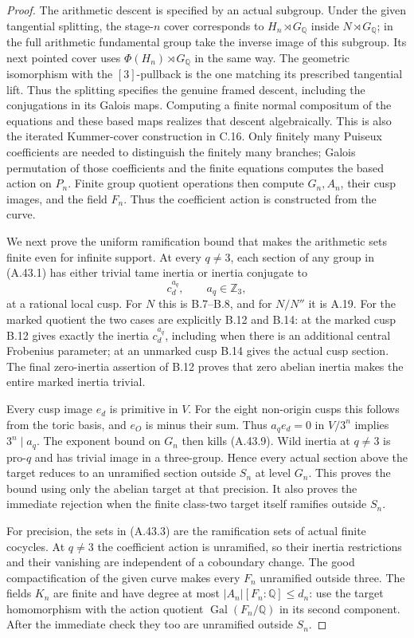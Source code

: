 \begin{proof}
The arithmetic descent is specified by an actual subgroup.
Under the given tangential splitting, the stage-$n$ cover
corresponds to $H_n\rtimes G_{\mathbb Q}$ inside
$N\rtimes G_{\mathbb Q}$; in the full arithmetic
fundamental group take the inverse image of this subgroup.
Its next pointed cover uses
$\Phi(H_n)\rtimes G_{\mathbb Q}$ in the same way.
The geometric isomorphism with the $[3]$-pullback is the
one matching its prescribed tangential lift. Thus the
splitting specifies the genuine framed descent, including
the conjugations in its Galois maps. Computing a finite
normal compositum of the equations and these based maps
realizes that descent algebraically. This is also the
iterated Kummer-cover construction in C.16.
Only finitely many Puiseux
coefficients are needed to distinguish the finitely many
branches; Galois permutation of those coefficients and
the finite equations computes the based action on $P_n$.
Finite group quotient operations then compute $G_n,A_n$,
their cusp images, and the field $F_n$. Thus the coefficient
action is constructed from the curve.

We next prove the uniform ramification bound that makes
the arithmetic sets finite even for infinite support.
At every $q\ne3$, each section of any group in (A.43.1)
has either trivial tame inertia or inertia conjugate to
\[
                         c_d^{a_q},\qquad a_q\in\mathbb Z_3,
 \tag{A.43.9}
\]
at a rational local cusp. For $N$ this is B.7--B.8, and
for $N/N''$ it is A.19. For the marked quotient the two
cases are explicitly B.12 and B.14: at the marked cusp
B.12 gives exactly the inertia $c_d^{a_q}$, including when
there is an additional central Frobenius parameter; at an
unmarked cusp B.14 gives the actual cusp section. The final
zero-inertia assertion of B.12 proves that zero abelian
inertia makes the entire marked inertia trivial.

Every cusp image $e_d$ is primitive in $V$. For the eight
non-origin cusps this follows from the toric basis, and
$e_O$ is minus their sum. Thus
$a_qe_d=0$ in $V/3^n$ implies $3^n\mid a_q$.
The exponent bound on $G_n$ then kills (A.43.9). Wild
inertia at $q\ne3$ is pro-$q$ and has trivial image in a
three-group. Hence every actual section above the target
reduces to an unramified section outside $S_n$ at level
$G_n$. This proves the bound using only the abelian target
at that precision. It also proves the immediate rejection
when the finite class-two target itself ramifies outside
$S_n$.

For precision, the sets in (A.43.3) are the ramification
sets of actual finite cocycles. At $q\ne3$ the coefficient
action is unramified, so their inertia restrictions and
their vanishing are independent of a coboundary change.
The good compactification of the given curve makes every
$F_n$ unramified outside three. The fields $K_n$ are finite
and have degree at most $|A_n|[F_n:\mathbb Q]\le d_n$:
use the target homomorphism with the action quotient
$\operatorname{Gal}(F_n/\mathbb Q)$ in its second component.
After the immediate check they too are unramified outside
$S_n$.


\end{proof}
